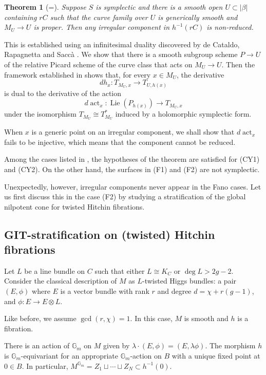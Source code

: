 \documentclass{amsart}
\theoremstyle{plain}
\newtheorem{theorem}{Theorem}[section]
\theoremstyle{definition}
\theoremstyle{remark}
\begin{document}
\begin{theorem}[=]
    Suppose $S$ is symplectic and there is a smooth open $U\subset|\beta|$ containing $rC$ such that the curve family over $U$ is generically smooth and $M_U\to U$ is proper.
    Then any irregular component in $h^{-1}(rC)$ is non-reduced.
\end{theorem}
This is established using an infinitesimal duality discovered by de Cataldo, Rapagnetta and Sacc\`a \cite{dCRS}.
We show that there is a smooth subgroup scheme $P\to U$ of the relative Picard scheme of the curve class that acts on $M_U\to U$.
Then the framework established in \cite{dCRS} shows that, for every $x\in M_U$, the derivative
\[dh_x:T_{M_U,x}\to T_{U,h(x)}\]
is dual to the derivative of the action
\[d\operatorname{act}_x:\operatorname{Lie}(P_{h(x)})\to T_{M_U,x}\]
under the isomorphism $T_{M_U}\cong T^\ast_{M_U}$ induced by a holomorphic symplectic form.

When $x$ is a generic point on an irregular component, we shall show that $d\operatorname{act}_x$ fails to be injective, which means that the component cannot be reduced.

Among the cases listed in , the hypotheses of the theorem are satisfied for (CY1) and (CY2).
On the other hand, the surfaces in (F1) and (F2) are not symplectic.

Unexpectedly, however, irregular components never appear in the Fano cases.
Let us first discuss this in the case (F2) by studying a stratification of the global nilpotent cone for twisted Hitchin fibrations.

\subsection{GIT-stratification on (twisted) Hitchin fibrations}
Let $L$ be a line bundle on $C$ such that either $L\cong K_C$ or $\deg L>2g-2$.
Consider the classical description of $M$ as $L$-twisted Higgs bundles: a pair $(E,\phi)$ where $E$ is a vector bundle with rank $r$ and degree $d=\chi+r(g-1)$, and $\phi:E\to E\otimes L$.

Like before, we assume $\gcd(r,\chi)=1$.
In this case, $M$ is smooth and $h$ is a fibration.

There is an action of $\mathbb G_m$ on $M$ given by $\lambda\cdot (E,\phi)=(E,\lambda\phi)$.
The morphism $h$ is $\mathbb G_m$-equivariant for an appropriate $\mathbb G_m$-action on $B$ with a unique fixed point at $0\in B$.
In particular, $M^{\mathbb G_m}=Z_1\sqcup\cdots\sqcup Z_N\subset h^{-1}(0)$.
\end{document}
